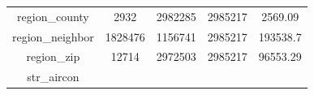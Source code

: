 \documentclass[]{book}
\theoremstyle{definition}
\theoremstyle{definition}
\theoremstyle{definition}
\theoremstyle{remark}
\begin{document}
\begin{longtable}[]{@{}ccccc@{}}
\begin{minipage}[t]{0.35\columnwidth}
region\_county\strut
\end{minipage} & \begin{minipage}[t]{0.12\columnwidth}\centering\strut
2932\strut
\end{minipage} & \begin{minipage}[t]{0.13\columnwidth}\centering\strut
2982285\strut
\end{minipage} & \begin{minipage}[t]{0.12\columnwidth}\centering\strut
2985217\strut
\end{minipage} & \begin{minipage}[t]{0.12\columnwidth}\centering\strut
2569.09\strut
\end{minipage}\tabularnewline
\begin{minipage}[t]{0.35\columnwidth}\centering\strut
region\_neighbor\strut
\end{minipage} & \begin{minipage}[t]{0.12\columnwidth}\centering\strut
1828476\strut
\end{minipage} & \begin{minipage}[t]{0.13\columnwidth}\centering\strut
1156741\strut
\end{minipage} & \begin{minipage}[t]{0.12\columnwidth}\centering\strut
2985217\strut
\end{minipage} & \begin{minipage}[t]{0.12\columnwidth}\centering\strut
193538.7\strut
\end{minipage}\tabularnewline
\begin{minipage}[t]{0.35\columnwidth}\centering\strut
region\_zip\strut
\end{minipage} & \begin{minipage}[t]{0.12\columnwidth}\centering\strut
12714\strut
\end{minipage} & \begin{minipage}[t]{0.13\columnwidth}\centering\strut
2972503\strut
\end{minipage} & \begin{minipage}[t]{0.12\columnwidth}\centering\strut
2985217\strut
\end{minipage} & \begin{minipage}[t]{0.12\columnwidth}\centering\strut
96553.29\strut
\end{minipage}\tabularnewline
\begin{minipage}[t]{0.35\columnwidth}\centering\strut
str\_aircon\strut
\end{minipage} & \begin{minipage}[t]{0.12\columnwidth}\centering\strut

\end{minipage}
\end{longtable}
\end{document}
